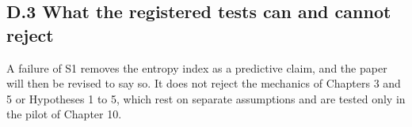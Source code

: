 \documentclass[11pt,a4paper]{article}
\theoremstyle{definition}
\theoremstyle{plain}
\theoremstyle{remark}
\begin{document}
\subsection*{D.3 What the registered tests can and cannot reject}
A failure of S1 removes the entropy index as a predictive claim, and the paper will then be revised to say so. It does not reject the mechanics of Chapters 3 and 5 or Hypotheses 1 to 5, which rest on separate assumptions and are tested only in the pilot of Chapter 10.

\endgroup
\end{document}
